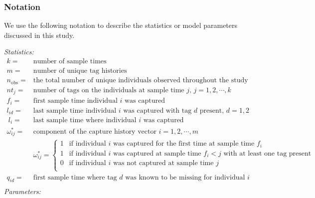 \documentclass[]{article}
\begin{document}
\subsubsection{Notation}\label{notation}

We use the following notation to describe the statistics or model
parameters discussed in this study.

\emph{Statistics:}\\
\[
  \begin{array}{ll}
      k= & \text{number of sample times} \\
      m= & \text{number of unique tag histories} \\
      n_{\text{obs}}= & \text{the total number of unique individuals observed throughout the study}\\
      nt_j= & \text{number of tags on the individuals at sample time $j$, $j=1,2, \cdots, k$}\\
      f_i= & \text{first sample time individual $i$ was captured}\\
      l_{id}= &\text{last sample time individual $i$ was captured with tag $d$ present, $d=1,2$}\\\
      l_i=&\text{last sample time where individual $i$ was captured}\\
      \omega_{ij}^*= &\text{component of the capture history vector $i=1,2, \cdots, m$}\\
      & \omega_{ij}^* = \left\{\begin{array}{ll}
                          1 & \text{if individual $i$ was captured for the first time at sample time $f_i$} \\
                          1 & \text{if individual $i$ was captured at sample time $f_i<j$ with at least one tag present}\\
                          
                          0 & \text{if individual $i$ was not captured at sample time $j$}\\
                      \end{array}\right. \\
     q_{id}= &\text{first sample time where tag $d$ was known to be missing for individual $i$}\\
  \end{array}
\]
\newpage
\emph{Parameters:}\\
\end{document}
